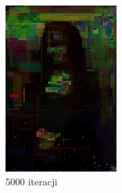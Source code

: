 \begin{figure}[!htb]
\begin{subfigure}[b]{0.3\textwidth}
         \includegraphics[width=\textwidth]{images/mona/10000_300_2/img_0_it_5000_best.png}
         \caption{5000 iteracji}
    \end{subfigure}
    \begin{subfigure}[b]{0.3\textwidth}
        \centering

\end{subfigure}
\end{figure}
